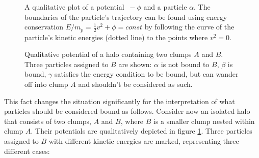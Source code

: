 \begin{figure}[h!]
	\centering
	\caption{A qualitative plot of a potential $\ -\phi$ and a particle $\alpha$. 
		The boundaries of the particle's trajectory can be found using energy conservation $E/m_p = \frac{1}{2}v^2 + \phi = const$ by following the curve of the particle's kinetic energies (dotted line) to the points where $v^2=0$.	
	}%
	\label{fig:orbits}
	\endminipage%
	\hspace*{\fill}
	\caption{Qualitative potential of a halo containing two clumps $A$ and $B$. Three particles assigned to $B$ are shown: $\alpha$ is not bound to $B$, $\beta$ is bound, $\gamma$ satisfies the energy condition to be bound, but can wander off into clump $A$ and shouldn't be considered as such.
	}%
	\label{fig:potentials}
	\endminipage\hspace*{\fill} 
\end{figure}
%
This fact changes the situation significantly for the interpretation of what particles should be considered bound as follows.
Consider now an isolated halo that consists of two clumps, $A$ and $B$, where $B$ is a smaller clump nested within clump $A$.
Their potentials are qualitatively depicted in figure \ref{fig:potentials}. 
Three particles assigned to $B$ with different kinetic energies are marked, representing three different cases:
%
